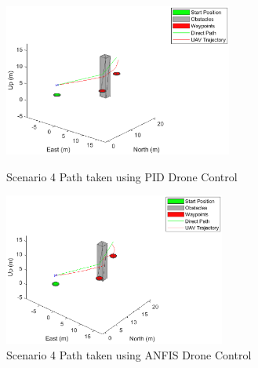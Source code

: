 \begin{figure}[H]
    \centering
    \begin{minipage}[b]{0.45\textwidth}
        \includegraphics[height=5cm,keepaspectratio]{img/scenario4_pid_paths.eps}
        \caption{Scenario 4 Path taken using PID Drone Control}
        \label{fig:Paths4_pid}
    \end{minipage}
    \hfill
    \begin{minipage}[b]{0.45\textwidth}
        \includegraphics[height=5cm,keepaspectratio]{img/scenario4_fis_paths.eps}
        \caption{Scenario 4 Path taken using ANFIS Drone Control}
        \label{fig:Paths4_fis}
    \end{minipage}
\end{figure}
